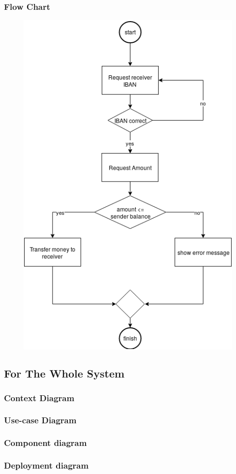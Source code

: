 \documentclass{article}
\begin{document}
		\newpage\subsubsection{Flow Chart}
		\begin{figure}[h!]
			\begin{center}
				\includegraphics[height=\linewidth]{img/transfer_flowchart.png}
			\end{center}
		\end{figure}
	\newpage\subsection{For The Whole System}
	\subsubsection{Context Diagram}	
	\subsubsection{Use-case Diagram}
	\subsubsection{Component diagram}
	\subsubsection{Deployment diagram}
\end{document}
